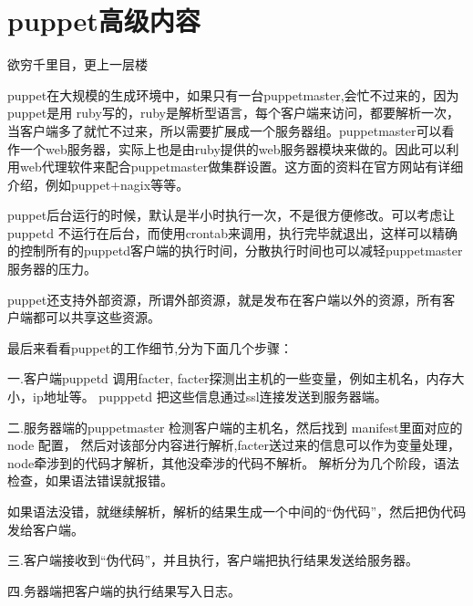 \chapter{\msyh puppet高级内容}
\begin{center}
\kai
欲穷千里目，更上一层楼
\end{center}
\par
puppet在大规模的生成环境中，如果只有一台puppetmaster,会忙不过来的，因为puppet是用 ruby写的，ruby是解析型语言，每个客户端来访问，都要解析一次，当客户端多了就忙不过来，所以需要扩展成一个服务器组。puppetmaster可以看作一个web服务器，实际上也是由ruby提供的web服务器模块来做的。因此可以利用web代理软件来配合puppetmaster做集群设置。这方面的资料在官方网站有详细介绍，例如puppet+nagix等等。\par
puppet后台运行的时候，默认是半小时执行一次，不是很方便修改。可以考虑让 puppetd 不运行在后台，而使用crontab来调用，执行完毕就退出，这样可以精确的控制所有的puppetd客户端的执行时间，分散执行时间也可以减轻puppetmaster服务器的压力。\par
puppet还支持外部资源，所谓外部资源，就是发布在客户端以外的资源，所有客户端都可以共享这些资源。\par
最后来看看puppet的工作细节,分为下面几个步骤：\par
一.客户端puppetd 调用facter, facter探测出主机的一些变量，例如主机名，内存大小，ip地址等。 pupppetd 把这些信息通过ssl连接发送到服务器端。\par
二.服务器端的puppetmaster 检测客户端的主机名，然后找到 manifest里面对应的 node 配置， 然后对该部分内容进行解析,facter送过来的信息可以作为变量处理，node牵涉到的代码才解析，其他没牵涉的代码不解析。 解析分为几个阶段，语法检查，如果语法错误就报错。\par
如果语法没错，就继续解析，解析的结果生成一个中间的“伪代码”，然后把伪代码发给客户端。\par
三.客户端接收到“伪代码”，并且执行，客户端把执行结果发送给服务器。\par
四.务器端把客户端的执行结果写入日志。\par

